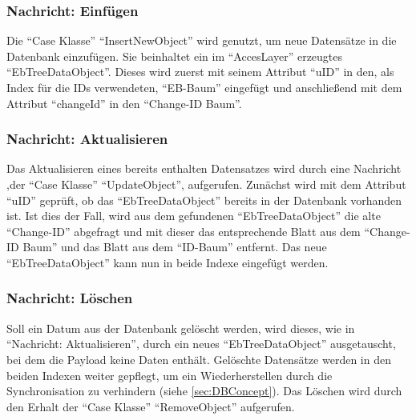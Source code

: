 \documentclass[a4paper,11pt,oneside,%
headsepline,												%
footsepline,												%
bibtotocnumbered									%
]{scrreprt}
\begin{document}
\subsubsection{Nachricht: Einfügen}
Die \enquote{Case Klasse} \enquote{InsertNewObject} wird genutzt, um neue Datensätze in die Datenbank einzufügen. Sie beinhaltet ein im \enquote{AccesLayer} erzeugtes \enquote{EbTreeDataObject}. Dieses wird zuerst mit seinem Attribut \enquote{uID} in den, als Index für die IDs verwendeten, \enquote{EB-Baum} eingefügt und anschließend mit dem Attribut \enquote{changeId} in den \enquote{Change-ID Baum}.
\subsubsection{Nachricht: Aktualisieren}
Das Aktualisieren eines bereits enthalten Datensatzes wird durch eine Nachricht ,der \enquote{Case Klasse} \enquote{UpdateObject}, aufgerufen. Zunächst wird mit dem Attribut \enquote{uID} geprüft, ob das \enquote{EbTreeDataObject} bereits in der Datenbank vorhanden ist. Ist dies der Fall, wird aus dem gefundenen \enquote{EbTreeDataObject} die alte \enquote{Change-ID} abgefragt und mit dieser das entsprechende Blatt aus dem \enquote{Change-ID Baum} und das Blatt aus dem \enquote{ID-Baum} entfernt. Das neue \enquote{EbTreeDataObject} kann nun in beide Indexe eingefügt werden.
\subsubsection{Nachricht: Löschen}
Soll ein Datum aus der Datenbank gelöscht werden, wird dieses, wie in \enquote{Nachricht: Aktualisieren}, durch ein neues \enquote{EbTreeDataObject} ausgetauscht, bei dem die Payload keine Daten enthält. Gelöschte Datensätze werden in den beiden Indexen weiter gepflegt, um ein Wiederherstellen durch die Synchronisation zu verhindern (siehe \autoref{sec:DBConcept}). Das Löschen wird durch den Erhalt der \enquote{Case Klasse} \enquote{RemoveObject} aufgerufen.
\end{document}
